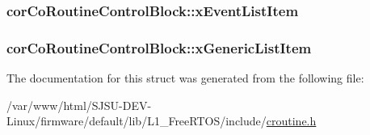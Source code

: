 \subsubsection[{\texorpdfstring{x\+Event\+List\+Item}{xEventListItem}}]{ cor\+Co\+Routine\+Control\+Block\+::x\+Event\+List\+Item}\hypertarget{structcorCoRoutineControlBlock_a105d316da0069f766acc3b210afed1b9}{}\label{structcorCoRoutineControlBlock_a105d316da0069f766acc3b210afed1b9}
\subsubsection[{\texorpdfstring{x\+Generic\+List\+Item}{xGenericListItem}}]{ cor\+Co\+Routine\+Control\+Block\+::x\+Generic\+List\+Item}\hypertarget{structcorCoRoutineControlBlock_aa2900494db8782eeb8ef12d482501406}{}\label{structcorCoRoutineControlBlock_aa2900494db8782eeb8ef12d482501406}


The documentation for this struct was generated from the following file\+:\begin{DoxyCompactItemize}
\item 
/var/www/html/\+S\+J\+S\+U-\/\+D\+E\+V-\/\+Linux/firmware/default/lib/\+L1\+\_\+\+Free\+R\+T\+O\+S/include/\hyperlink{croutine_8h}{croutine.\+h}\end{DoxyCompactItemize}
